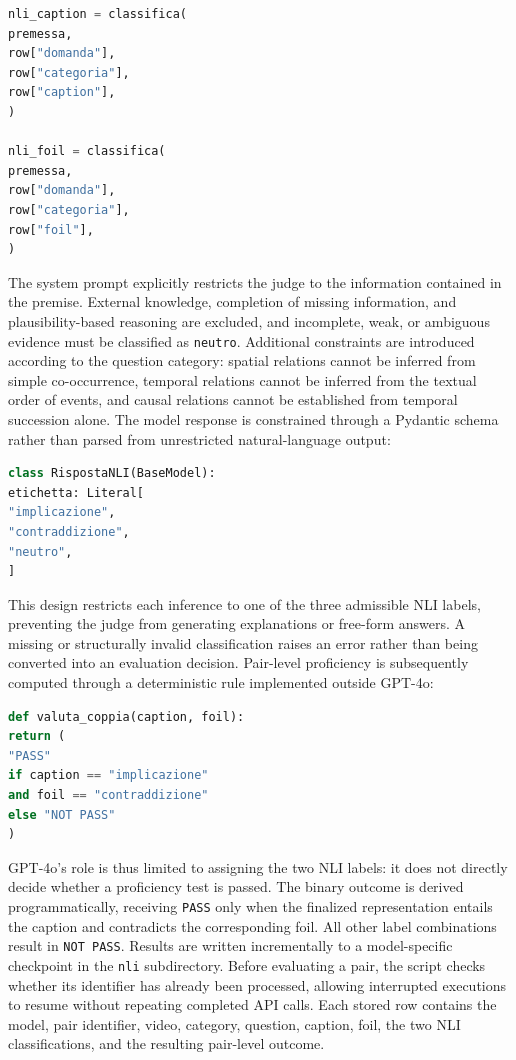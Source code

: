 \begin{lstlisting}[language=Python]
nli_caption = classifica(
premessa,
row["domanda"],
row["categoria"],
row["caption"],
)

nli_foil = classifica(
premessa,
row["domanda"],
row["categoria"],
row["foil"],
)
\end{lstlisting}
The system prompt explicitly restricts the judge to the information contained in the premise. External knowledge, completion of missing information, and plausibility-based reasoning are excluded, and incomplete, weak, or ambiguous evidence must be classified as \texttt{neutro}. Additional constraints are introduced according to the question category: spatial relations cannot be inferred from simple co-occurrence, temporal relations cannot be inferred from the textual order of events, and causal relations cannot be established from temporal succession alone.
The model response is constrained through a Pydantic schema rather than parsed from unrestricted natural-language output:
\begin{lstlisting}[language=Python]
class RispostaNLI(BaseModel):
etichetta: Literal[
"implicazione",
"contraddizione",
"neutro",
]
\end{lstlisting}
This design restricts each inference to one of the three admissible NLI labels, preventing the judge from generating explanations or free-form answers. A missing or structurally invalid classification raises an error rather than being converted into an evaluation decision.
Pair-level proficiency is subsequently computed through a deterministic rule implemented outside GPT-4o:
\begin{lstlisting}[language=Python]
def valuta_coppia(caption, foil):
return (
"PASS"
if caption == "implicazione"
and foil == "contraddizione"
else "NOT PASS"
)
\end{lstlisting}
GPT-4o's role is thus limited to assigning the two NLI labels: it does not directly decide whether a proficiency test is passed. The binary outcome is derived programmatically, receiving \texttt{PASS} only when the finalized representation entails the caption and contradicts the corresponding foil. All other label combinations result in \texttt{NOT PASS}.
Results are written incrementally to a model-specific checkpoint in the \texttt{nli} subdirectory. Before evaluating a pair, the script checks whether its identifier has already been processed, allowing interrupted executions to resume without repeating completed API calls. Each stored row contains the model, pair identifier, video, category, question, caption, foil, the two NLI classifications, and the resulting pair-level outcome.

